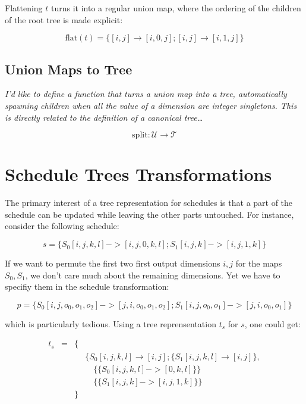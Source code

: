 \documentclass{article}
\begin{document}
Flattening $t$ turns it into a regular union map, where the ordering of the children of the root tree is made explicit:

\[
    \text{flat}(t) = \{ [i,j] \rightarrow [i,0,j] ; [i,j] \rightarrow [i,1,j] \}
\]

\subsection{Union Maps to Tree}

{ \raggedleft\emph{I'd like to define a function that turns a union map into a
tree, automatically spawning children when all the value of a dimension are
integer singletons. This is directly related to the definition of a canonical tree\dots} }

\[
    \text{split}: \mathcal{U} \rightarrow \mathcal{T}
\]



\section{Schedule Trees Transformations}

The primary interest of a tree representation for schedules is that a part of
the schedule can be updated while leaving the other parts untouched. For instance, consider the following schedule:

\[
    s = \{ S_0[i,j,k,l] -> [i,j,0,k,l] ; S_1[i,j,k] -> [i,j,1,k] \}
\]

If we want to permute the first two first output dimensions $i, j$ for the maps
$S_0, S_1$, we don't care much about the remaining dimensions. Yet we have to
specifiy them in the schedule transformation:

\[
    p = \{ S_0[i,j,o_0,o_1,o_2] -> [j,i,o_0,o_1,o_2] ; S_1[i,j,o_0, o_1] -> [j,i,o_0,o_1] \}
\]

\noindent which is particularly tedious. Using a tree reprensentation $t_s$ for $s$, one could get:

\[
    \begin{array}{lcll}
        t_s &=& \{ &\\
            & &    & \{S_0[i,j,k,l] \rightarrow [i,j] ; \{S_1[i,j,k,l] \rightarrow [i,j] \},\\
            & &    & \quad\{ \{ S_0[i,j,k,l] -> [0,k,l] \} \}\\
            & &    & \quad\{ \{ S_1[i,j,k] -> [i,j,1,k] \} \}\\
            & & \} &\\
    \end{array}
\]
\end{document}
